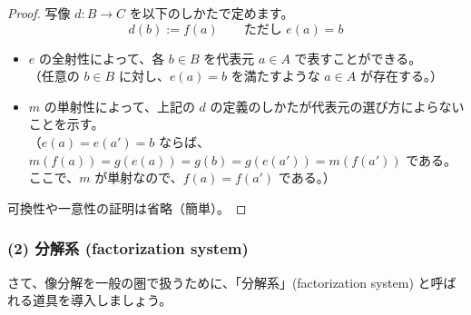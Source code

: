 \documentclass[
		head_space=20mm,
		foot_space=20mm,
		gutter=10mm,
		line_length=190mm
]{jlreq}
\begin{document}
\begin{proof}%
\noindent 写像 $d:B\to C$ を以下のしかたで定めます。
\[d(b):=f(a)\qquad\textrm{ただし~} e(a)=b\]
\begin{itemize}
	\item $e$ の全射性によって、各 $b\in B$ を代表元 $a\in A$ で表すことができる。\\（任意の $b\in B$ に対し、$e(a)=b$ を満たすような $a\in A$ が存在する。）
	\item $m$ の単射性によって、上記の $d$ の定義のしかたが代表元の選び方によらないことを示す。\\（$e(a)=e(a')=b$ ならば、$m(f(a))=g(e(a))=g(b)=g(e(a'))=m(f(a'))$ である。\\ ここで、$m$ が単射なので、$f(a)=f(a')$ である。）%
\end{itemize}
可換性や一意性の証明は省略（簡単）。
\end{proof}

\subsubsection*{(2) 分解系 (factorization system)}

\noindent さて、像分解を一般の圏で扱うために、「分解系」(factorization system) と呼ばれる道具を導入しましょう。 
\end{document}
